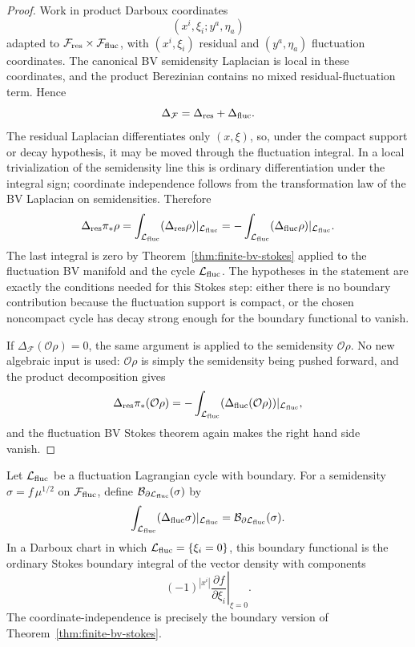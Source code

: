 \begin{proof}
Work in product Darboux coordinates
\[
  (x^i,\xi_i;y^a,\eta_a)
\]
adapted to
\(\mathcal F_{\rm res}\times\mathcal F_{\rm fluc}\), with
\((x^i,\xi_i)\) residual and \((y^a,\eta_a)\) fluctuation coordinates.  The
canonical BV semidensity Laplacian is local in these coordinates, and the
product Berezinian contains no mixed residual-fluctuation term.  Hence
\[
  \Delta_{\mathcal F}=\Delta_{\rm res}+\Delta_{\rm fluc}.
\]
The residual Laplacian differentiates only \((x,\xi)\), so, under the compact
support or decay hypothesis, it may be moved through the fluctuation
integral.  In a local trivialization of the semidensity line this is ordinary
differentiation under the integral sign; coordinate independence follows from
the transformation law of the BV Laplacian on semidensities.  Therefore
\[
  \Delta_{\rm res}\pi_*\rho
  =
  \int_{\mathcal L_{\rm fluc}}
  (\Delta_{\rm res}\rho)|_{\mathcal L_{\rm fluc}}
  =
  -\int_{\mathcal L_{\rm fluc}}
  (\Delta_{\rm fluc}\rho)|_{\mathcal L_{\rm fluc}} .
\]
The last integral is zero by Theorem~\ref{thm:finite-bv-stokes} applied to
the fluctuation BV manifold and the cycle
\(\mathcal L_{\rm fluc}\).  The hypotheses in the statement are exactly the
conditions needed for this Stokes step: either there is no boundary
contribution because the fluctuation support is compact, or the chosen
noncompact cycle has decay strong enough for the boundary functional to
vanish.

If \(\Delta_{\mathcal F}(\mathcal O\rho)=0\), the same argument is applied to
the semidensity \(\mathcal O\rho\).  No new algebraic input is used:
\(\mathcal O\rho\) is simply the semidensity being pushed forward, and the
product decomposition gives
\[
  \Delta_{\rm res}\pi_*(\mathcal O\rho)
  =
  -\int_{\mathcal L_{\rm fluc}}
  (\Delta_{\rm fluc}(\mathcal O\rho))|_{\mathcal L_{\rm fluc}},
\]
and the fluctuation BV Stokes theorem again makes the right hand side vanish.
\end{proof}

\begin{definition}
\label{def:bv-fluctuation-boundary-functional}
Let \(\mathcal L_{\rm fluc}\) be a fluctuation Lagrangian cycle with boundary.
For a semidensity \(\sigma=f\,\mu^{1/2}\) on
\(\mathcal F_{\rm fluc}\), define
\(\mathcal B_{\partial\mathcal L_{\rm fluc}}(\sigma)\) by
\begin{equation}
  \int_{\mathcal L_{\rm fluc}}(\Delta_{\rm fluc}\sigma)|_{\mathcal L_{\rm fluc}}
  =
  \mathcal B_{\partial\mathcal L_{\rm fluc}}(\sigma).
  \label{eq:bv-boundary-functional-definition}
\end{equation}
In a Darboux chart in which
\(\mathcal L_{\rm fluc}=\{\xi_i=0\}\), this boundary functional is the
ordinary Stokes boundary integral of the vector density with components
\begin{equation}
  (-1)^{|x^i|}
  \left.
  \frac{\partial f}{\partial \xi_i}
  \right|_{\xi=0}.
  \label{eq:bv-boundary-vector-density}
\end{equation}
The coordinate-independence is precisely the boundary version of
Theorem~\ref{thm:finite-bv-stokes}.
\end{definition}

